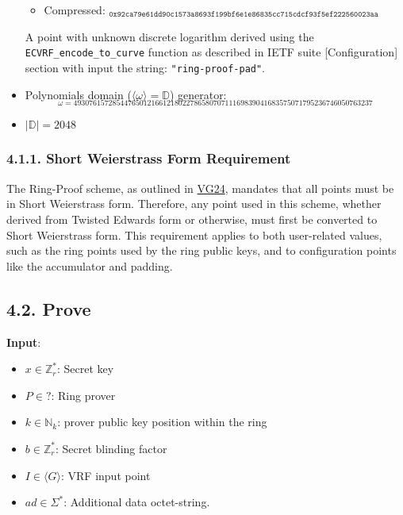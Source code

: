 \documentclass[
]{article}
\providecommand{\tightlist}{%
  \setlength{\itemsep}{0pt}\setlength{\parskip}{0pt}}
\begin{document}
\begin{itemize}
  \begin{itemize}
  \tightlist
  \item
    Compressed:
    \(_{\texttt{0x92ca79e61dd90c1573a8693f199bf6e1e86835cc715cdcf93f5ef222560023aa}}\)
  \end{itemize}

  A point with unknown discrete logarithm derived using the
  \texttt{ECVRF\_encode\_to\_curve} function as described in IETF suite
  {[}Configuration{]} section with input the string:
  \texttt{"ring-proof-pad"}.
\item
  Polynomials domain (\(\langle \omega \rangle = \mathbb{D}\))
  generator:
  \[_{\omega = 49307615728544765012166121802278658070711169839041683575071795236746050763237}\]
\item
  \(|\mathbb{D}| = 2048\)
\end{itemize}

\subsubsection{4.1.1. Short Weierstrass Form
Requirement}\label{short-weierstrass-form-requirement}

The Ring-Proof scheme, as outlined in
\href{https://github.com/davxy/ring-proof-spec}{VG24}, mandates that all
points must be in Short Weierstrass form. Therefore, any point used in
this scheme, whether derived from Twisted Edwards form or otherwise,
must first be converted to Short Weierstrass form. This requirement
applies to both user-related values, such as the ring points used by the
ring public keys, and to configuration points like the accumulator and
padding.

\subsection{4.2. Prove}\label{prove-2}

\textbf{Input}:

\begin{itemize}
\tightlist
\item
  \(x \in \mathbb{Z}^*_r\): Secret key
\item
  \(P \in ?\): Ring prover
\item
  \(k \in \mathbb{N}_k\): prover public key position within the ring
\item
  \(b \in \mathbb{Z}^*_r\): Secret blinding factor
\item
  \(I \in \langle G \rangle\): VRF input point
\item
  \(ad \in \Sigma^*\): Additional data octet-string.
\end{itemize}
\end{document}
